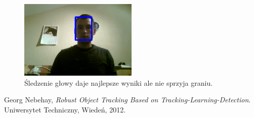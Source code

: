 \documentclass{article}
\begin{document}
\begin{figure}[!ht]
\centering
\includegraphics[width=0.5\textwidth]{head-blue.png}
\caption{Śledzenie głowy daje najlepsze wyniki ale nie sprzyja graniu.}
\label{fig:head-blue}
\end{figure}

\begin{thebibliography}{9}

  Georg Nebehay,
  \emph{Robust Object Tracking Based on Tracking-Learning-Detection}.
  Uniwersytet Techniczny, Wiedeń,
  2012.

\end{thebibliography}
\end{document}
